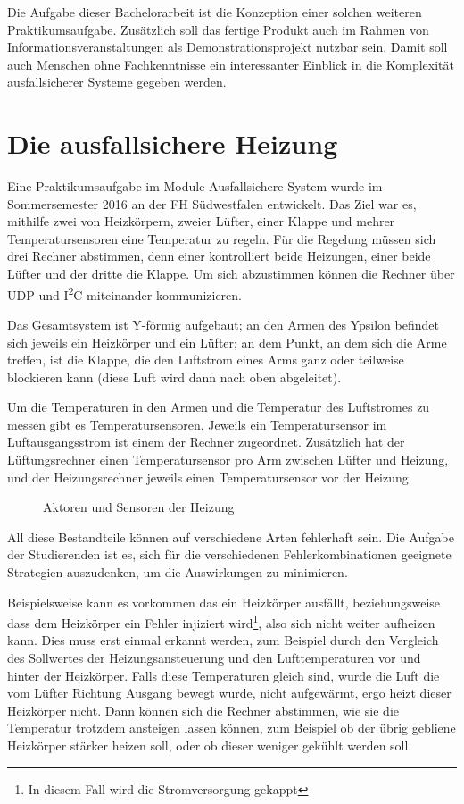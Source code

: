 Die Aufgabe dieser Bachelorarbeit ist die Konzeption einer solchen weiteren Praktikumsaufgabe. 
Zus{\"{a}}tzlich soll das fertige Produkt auch im Rahmen von Informationsveranstaltungen als Demonstrationsprojekt 
nutzbar sein. Damit soll auch Menschen ohne Fachkenntnisse ein interessanter Einblick in die 
Komplexit{\"{a}}t ausfallsicherer Systeme gegeben werden.

\section{Die ausfallsichere Heizung}\label{heizung}
Eine Praktikumsaufgabe im Module Ausfallsichere System wurde im Sommersemester 2016 an der FH S{\"{u}}dwestfalen entwickelt. Das Ziel war es, mithilfe zwei von Heizk{\"{o}}rpern, zweier
L{\"{u}}fter, einer Klappe und mehrer Temperatursensoren eine Temperatur zu regeln. F{\"{u}}r die Regelung m{\"{u}}ssen sich drei Rechner abstimmen, denn einer kontrolliert
beide Heizungen, einer beide L{\"{u}}fter und der dritte die Klappe. Um sich abzustimmen k{\"{o}}nnen die Rechner {\"{u}}ber UDP und I\textsuperscript{2}C miteinander kommunizieren.

Das Gesamtsystem ist Y-f{\"{o}}rmig aufgebaut; an den Armen des Ypsilon befindet sich jeweils ein Heizk{\"{o}}rper und ein L{\"{u}}fter; an dem Punkt, an dem sich
die Arme treffen, ist die Klappe, die den Luftstrom eines Arms ganz oder teilweise blockieren kann (diese Luft wird dann nach oben abgeleitet).

Um die Temperaturen in den Armen und die Temperatur des Luftstromes zu messen gibt es Temperatursensoren. Jeweils ein Temperatursensor im Luftausgangsstrom ist einem
der Rechner zugeordnet. Zus{\"{a}}tzlich hat der L{\"{u}}ftungsrechner einen Temperatursensor pro Arm zwischen L{\"{u}}fter und Heizung, und der Heizungsrechner jeweils
einen Temperatursensor vor der Heizung.

\begin{figure}
	\centering
	\caption{Aktoren und Sensoren der Heizung}
	\label{fig:heizunghw}
\end{figure}

All diese Bestandteile k{\"{o}}nnen auf verschiedene Arten fehlerhaft sein. Die Aufgabe der Studierenden
ist es, sich f{\"{u}}r die verschiedenen Fehlerkombinationen
geeignete Strategien auszudenken, um die Auswirkungen zu minimieren.

Beispielsweise kann es vorkommen das ein Heizk{\"{o}}rper ausf{\"{a}}llt, beziehungsweise dass dem
Heizk{\"{o}}rper ein Fehler injiziert wird\footnote{In diesem Fall wird die Stromversorgung gekappt},
also sich nicht weiter aufheizen kann. Dies muss erst einmal erkannt werden, zum Beispiel
durch den Vergleich des Sollwertes der Heizungsansteuerung und den Lufttemperaturen vor und hinter der Heizk{\"{o}}rper. Falls diese Temperaturen gleich sind,
wurde die Luft die vom L{\"{u}}fter Richtung Ausgang bewegt wurde, nicht aufgew{\"{a}}rmt, ergo heizt dieser Heizk{\"{o}}rper nicht. Dann k{\"{o}}nnen sich die
Rechner abstimmen, wie sie die Temperatur trotzdem ansteigen lassen k{\"{o}}nnen, zum Beispiel ob der {\"{u}}brig gebliene Heizk{\"{o}}rper st{\"{a}}rker heizen
soll, oder ob dieser weniger gek{\"{u}}hlt werden soll.

